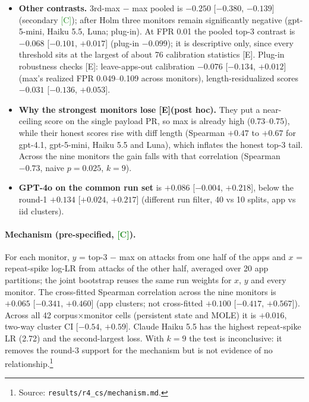 \documentclass[11pt]{article}
\newcommand{\m}{\ensuremath{-}}
\newcommand{\src}[1]{\footnote{Source: \nolinkurl{#1}.}}
\newcommand{\tC}{\textsf{\scriptsize\textcolor{ForestGreen}{[C]}}\xspace}
\newcommand{\tE}{\textsf{\scriptsize\textcolor{ink2}{[E]}}\xspace}
\begin{document}
\begin{itemize}
\item \textbf{Other contrasts.} 3rd-max $-$ max pooled is $\m0.250$ [$\m0.380$, $\m0.139$] (secondary \tC); after Holm three monitors remain significantly negative (gpt-5-mini, Haiku 5.5, Luna; plug-in). At FPR 0.01 the pooled top-3 contrast is $\m0.068$ [$\m0.101$, $+0.017$] (plug-in $\m0.099$); it is descriptive only, since every threshold sits at the largest of about 76 calibration statistics \tE. Plug-in robustness checks \tE: leave-apps-out calibration $\m0.076$ [$\m0.134$, $+0.012$] (max's realized FPR 0.049--0.109 across monitors), length-residualized scores $\m0.031$ [$\m0.136$, $+0.053$].
\item \textbf{Why the strongest monitors lose \tE (post hoc).} They put a near-ceiling score on the single payload PR, so max is already high (0.73--0.75), while their honest scores rise with diff length (Spearman $+0.47$ to $+0.67$ for gpt-4.1, gpt-5-mini, Haiku 5.5 and Luna), which inflates the honest top-3 tail. Across the nine monitors the gain falls with that correlation (Spearman $\m0.73$, naive $p=0.025$, $k=9$).
\item \textbf{GPT-4o on the common run set} is $+0.086$ [$\m0.004$, $+0.218$], below the round-1 $+0.134$ [$+0.024$, $+0.217$] (different run filter, 40 vs 10 splits, app vs iid clusters).
\end{itemize}

\paragraph{Mechanism (pre-specified, \tC).} For each monitor, $y$ = top-3 $-$ max on attacks from one half of the apps and $x$ = repeat-spike log-LR from attacks of the other half, averaged over 20 app partitions; the joint bootstrap reuses the same run weights for $x$, $y$ and every monitor. The cross-fitted Spearman correlation across the nine monitors is $+0.065$ [$\m0.341$, $+0.460$] (app clusters; not cross-fitted $+0.100$ [$\m0.417$, $+0.567$]). Across all 42 corpus$\times$monitor cells (persistent state and MOLE) it is $+0.016$, two-way cluster CI [$\m0.54$, $+0.59$]. Claude Haiku 5.5 has the highest repeat-spike LR (2.72) and the second-largest loss. With $k=9$ the test is inconclusive: it removes the round-3 support for the mechanism but is not evidence of no relationship.\src{results/r4_cs/mechanism.md}
\end{document}
